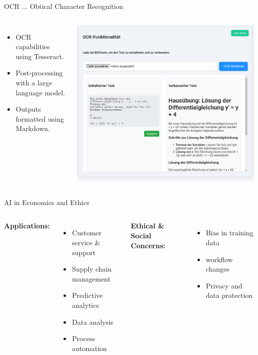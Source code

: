 \documentclass{beamer}
\begin{document}
\begin{frame}{OCR ... Obtical Character Recognition}
  \begin{columns}
      \begin{itemize}
        \item OCR capabilities using Tesseract.
        \item Post-processing with a large language model.
        \item Outputs formatted using Markdown.
      \end{itemize}
      \centering
      \includegraphics[width=\textwidth]{OCR-functonalatie.png}
  \end{columns}
\end{frame}

\begin{frame}{AI in Economics and Ethics}
  \begin{columns}
      \textbf{Applications:}
      \begin{itemize}
        \item Customer service \& support
        \item Supply chain management
        \item Predictive analytics
        \item Data analysis
        \item Process automation
      \end{itemize}
      \textbf{Ethical \& Social Concerns:}
      \begin{itemize}
        \item Bias in training data
        \item workflow changes
        \item Privacy and data protection
      \end{itemize}
  \end{columns}
\end{frame}
\end{document}
